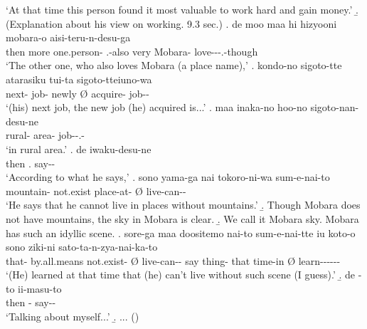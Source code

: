 		`At that time this person found it most valuable to work hard and gain money.'
 \b. (Explanation about his view on working. 9.3 sec.)
 \bg. de moo  maa  hi hizyooni mobara-o aisi-teru-n-desu-ga \\
 	then more one.person-  .-also  very Mobara- love---.-though \\
	`The other one, who also loves Mobara (a place name),'
 \bg. kondo-no sigoto-tte atarasiku \EM{\O} tui-ta sigoto-tteiuno-wa \\
 		next- job- newly {\O} acquire- job-- \\
		`(his) next job, the new job (he) acquired is...'
 \bg. maa inaka-no hoo-no sigoto-nan-desu-ne \\
 	 rural- area- job--.- \\
	`in rural area.'
 \bg. de  iwaku-desu-ne \\
 	then . say-- \\
	`According to what he says,'
 \bg. sono yama-ga nai tokoro-ni-wa \EM{\O} sum-e-nai-to \\
 	 mountain- not.exist place-at- {\O} live-can-- \\
 	`He says that he cannot live in places without mountains.'
 \b. Though Mobara does not have mountains, the sky in Mobara is clear.
 \b. We call it Mobara sky. Mobara has such an idyllic scene.
 \bg. sore-ga maa doositemo nai-to \EM{\O} sum-e-nai-tte iu koto-o sono ziki-ni \EM{\O} sato-ta-n-zya-nai-ka-to \\
 	that-  by.all.means not.exist- {\O} live-can-- say thing- that time-in {\O} learn------ \\
	`(He) learned at that time that (he) can't live without such scene (I guess).'
 \b. de -to ii-masu-to \\
 	then - say-- \\
	`Talking about myself...'
 \b. ...
   \hfill{()}
